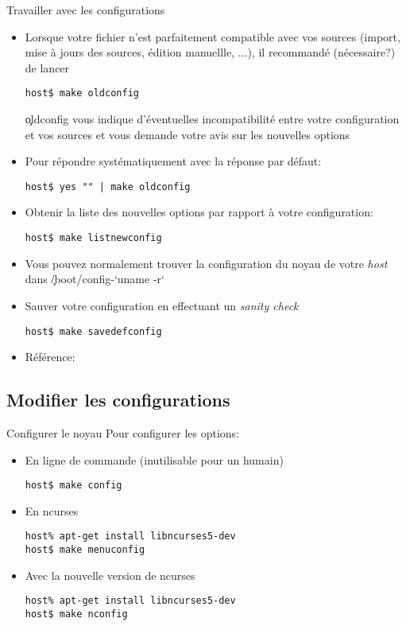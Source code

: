 \begin{frame}[fragile=singleslide]{Travailler avec les configurations}
  \begin{itemize} 
  \item  Lorsque  votre   fichier    n'est  parfaitement
    compatible  avec vos sources  (import, mise  à jours  des sources,
    édition manuellle, ...), il recommandé (nécessaire?) de lancer
    \begin{lstlisting} 
host$ make oldconfig
    \end{lstlisting} 
    \c{oldconfig}  vous  indique  d'éventuelles incompatibilité  entre
    votre configuration et vos sources  et vous demande votre avis sur
    les nouvelles options
  \item Pour répondre systématiquement avec la réponse par défaut:
    \begin{lstlisting} 
host$ yes "" | make oldconfig
    \end{lstlisting} 
  \item Obtenir  la liste  des nouvelles options  par rapport  à votre
    configuration:
   \begin{lstlisting} 
host$ make listnewconfig
   \end{lstlisting} 
 \item Vous  pouvez normalement trouver  la configuration du  noyau de
   votre \emph{host} dans \c{/boot/config-`uname -r`}
 \item Sauver votre configuration en effectuant un \emph{sanity check}
   \begin{lstlisting}  
host$ make savedefconfig
   \end{lstlisting} 
  \item Référence: 
 \end{itemize}
\end{frame} 

\subsection{Modifier les configurations}
\begin{frame}[fragile=singleslide]{Configurer le noyau}
 Pour configurer les options:
 \begin{itemize}    
 \item En ligne de commande (inutilisable pour un humain)
   \begin{lstlisting}
host$ make config
   \end{lstlisting} %
 \item En ncurses
   \begin{lstlisting}
host% apt-get install libncurses5-dev
host$ make menuconfig
   \end{lstlisting} %
 \item Avec la nouvelle version de ncurses 
   \begin{lstlisting}
host% apt-get install libncurses5-dev
host$ make nconfig
   \end{lstlisting} %
\end{itemize} 
\end{frame} 


